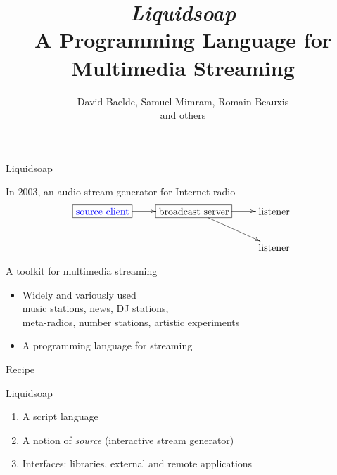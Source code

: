 \documentclass{beamer}
\title{\emph{\LARGE Liquidsoap} \\
  A Programming Language for \\ Multimedia Streaming}
\date{David Baelde, Samuel Mimram, Romain Beauxis \\ and others}
\renewcommand{\emph}[1]{\alert{#1}}
\renewcommand{\textbf}[1]{{\color{blue} #1}}
\begin{document}
\begin{frame}
  \maketitle
\end{frame}


\begin{frame}{Liquidsoap}

  In 2003, an audio stream generator for Internet radio
  \[
  \xymatrix{
    *+[F]{\text{\textbf{source client}}}\ar[r]&
    *+[F]{\text{broadcast server}}
    \ar[r]\ar[dr]&
    *+{\text{listener}}\\
    &&*+{\text{listener}}
  }
  \]

  \begin{block}{A toolkit for multimedia streaming}
  \begin{itemize}
  \item Widely and variously used \\
     \quad music stations, news, DJ stations, \\
     \quad meta-radios, number stations, artistic experiments
  \item A programming \emph{language} for streaming
  \end{itemize}
  \end{block}

\end{frame}

\begin{frame}{Recipe}

\begin{block}{Liquidsoap}
\begin{enumerate}
\item<3-> A script language
\item<2-> A notion of {\em source} (interactive stream generator)
\item<1-> Interfaces: libraries, external and remote applications
\end{enumerate}
\end{block}


\end{frame}
\end{document}
